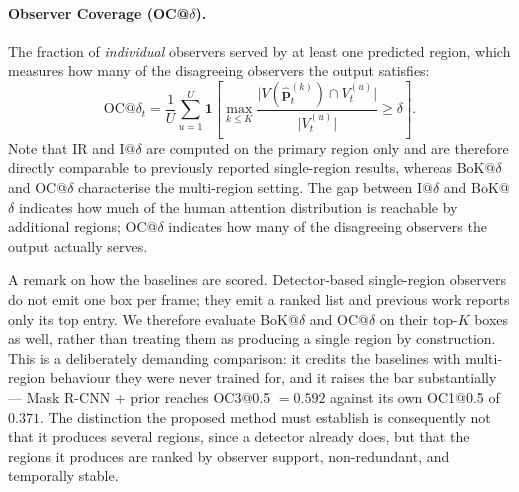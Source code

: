 \documentclass[preprint,12pt]{elsarticle}
\begin{document}
\paragraph{Observer Coverage (OC@$\delta$).}
The fraction of \emph{individual} observers served by at least one predicted
region, which measures how many of the disagreeing observers the output
satisfies:
\begin{equation}
  \text{OC@}\delta_t = \frac{1}{U}\sum_{u=1}^{U} \mathbf{1}\!\left[
    \max_{k \le K} \frac{\bigl|V(\hat{\mathbf{p}}^{(k)}_t) \cap V^{(u)}_t\bigr|}
                        {\bigl|V^{(u)}_t\bigr|} \ge \delta\right].
  \label{eq:oc}
\end{equation}
Note that $\text{IR}$ and $\text{I@}\delta$ are computed on the primary region
only and are therefore directly comparable to previously reported
single-region results, whereas BoK@$\delta$ and OC@$\delta$ characterise the
multi-region setting. The gap between $\text{I@}\delta$ and BoK@$\delta$
indicates how much of the human attention distribution is reachable by
additional regions; OC@$\delta$ indicates how many of the disagreeing observers
the output actually serves.

A remark on how the baselines are scored. Detector-based single-region
observers do not emit one box per frame; they emit a ranked list and previous
work reports only its top entry. We therefore evaluate BoK@$\delta$ and
OC@$\delta$ on their top-$K$ boxes as well, rather than treating them as
producing a single region by construction. This is a deliberately demanding
comparison: it credits the baselines with multi-region behaviour they were
never trained for, and it raises the bar substantially — Mask R-CNN + prior
reaches OC3@0.5 $=0.592$ against its own OC1@0.5 of $0.371$. The distinction
the proposed method must establish is consequently not that it produces several
regions, since a detector already does, but that the regions it produces are
ranked by observer support, non-redundant, and temporally stable.
\end{document}
